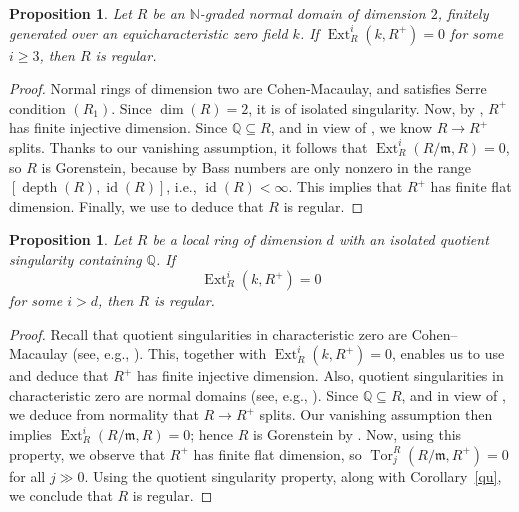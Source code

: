 \documentclass[11pt,a4paper]{amsart}
\numberwithin{equation}{section}
\newtheorem{proposition}[theorem]{Proposition}
\theoremstyle{definition}
\theoremstyle{remark}
\newcommand{\id}{\operatorname{id}}
\newcommand{\Ext}{\operatorname{Ext}}
\newcommand{\depth}{\operatorname{depth}}
\begin{document}
	
	
\begin{proposition}
Let \(R\) be an \(\mathbb{N}\)-graded normal domain of dimension \(2\), finitely generated over an equicharacteristic zero field \(k\). If \(\Ext_R^i(k,R^+)=0\) for some \(i \geq 3\), then \(R\) is regular.
	\end{proposition}
	
	\begin{proof}	
Normal rings of dimension two are Cohen-Macaulay, and satisfies Serre condition $(R_1)$. Since $\dim(R)=2$, it is of isolated singularity. Now, by \cite[Page 226]{sc3}, \(R^+\) has finite injective dimension. Since $\mathbb{Q}\subseteq R$, and in view of \cite[Lemma 2.1]{p}, we know \(R\to R^+\) splits. Thanks to our vanishing assumption, it follows that \(\operatorname{Ext}^{i}_{R}(R/\mathfrak{m},R)=0\), so \(R\) is Gorenstein, because by \cite{Ro2} Bass numbers are only nonzero in the range $[\depth(R), \id(R)]$, i.e., $\id(R)<\infty$. This implies that \(R^+\) has finite flat dimension. Finally, we use  \cite[Theorem A]{p} to deduce that 
\(R\) is regular.
	\end{proof}



\begin{proposition}
	Let \(R\) be a local ring of dimension \(d\) with an isolated quotient singularity containing \(\mathbb{Q}\). If
	\[
	\operatorname{Ext}_R^i(k, R^+) = 0
	\]
	for some \(i > d\), then \(R\) is regular.
\end{proposition}

\begin{proof}
	Recall that quotient singularities in characteristic zero are Cohen--Macaulay (see, e.g., \cite[6.5.1]{BH}). This, together with \(\operatorname{Ext}_R^i(k, R^+) = 0\), enables us to use \cite[page 226]{sc3} and deduce that \(R^+\) has finite injective dimension.
	Also, quotient singularities in characteristic zero are normal domains (see, e.g., \cite[6.4.1]{BH}). Since \(\mathbb{Q} \subseteq R\), and in view of \cite[Lemma 2.1]{p}, we deduce from normality that \(R \to R^+\) splits. Our vanishing assumption then implies \(\operatorname{Ext}_R^i(R/\mathfrak{m}, R) = 0\); hence \(R\) is Gorenstein by \cite{Ro2}.
Now, using this property, we observe that \(R^+\) has finite flat dimension, so
	\(
	\operatorname{Tor}_j^R(R/\mathfrak{m}, R^+) = 0
	\)
	for all \(j \gg 0\). Using the quotient singularity property, along with Corollary~\ref{qu}, we conclude that \(R\) is regular.
\end{proof}
\end{document}
